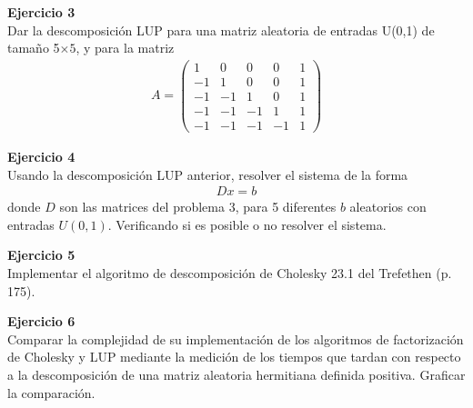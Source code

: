 \documentclass[a4paper, 11pt]{article}
\newenvironment{problem}[2][Ejercicio]
{ \begin{mdframed}[backgroundcolor= red!50] \textbf{#1 #2} \\}
	{  \end{mdframed}}
\begin{document}
\begin{problem}{3}
    Dar la descomposición LUP para una matriz aleatoria de entradas U(0,1) de tamaño 5$\times 5$, y para la matriz
    \begin{align}
        A = \begin{pmatrix}
            1 &0  &0  &0 &1 \\ 
            -1 &1  &0  &0 &1 \\ 
            -1 &-1  &1 &0  &1 \\ 
            -1 &-1  &-1  &1 &1\\
            -1 & -1 & -1 & -1 &1 
            \end{pmatrix}
    \end{align}
\end{problem}



\begin{problem}{4}
    Usando la descomposición LUP anterior, resolver el sistema de la forma
    \begin{align}
        Dx = b 
    \end{align}
    donde $D$ son las matrices del problema 3, para 5 diferentes $b$ aleatorios con entradas $U(0,1)$. Verificando si es posible o no resolver el sistema.
\end{problem}


\begin{problem}{5}
    Implementar el algoritmo de descomposición de Cholesky 23.1 del Trefethen (p. 175).
\end{problem}

\begin{problem}{6}
    Comparar la complejidad de su implementación de los algoritmos de factorización de Cholesky y LUP mediante la medición de los tiempos que tardan con respecto a la descomposición de una matriz aleatoria hermitiana definida positiva. Graficar la comparación.
\end{problem}
\end{document}
